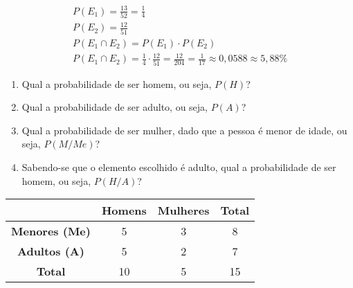 \documentclass{jhwhw}
\begin{document}
\begin{gather*}
	P(E_1) = \frac{13}{52} = \frac{1}{4}\\
	P(E_2) = \frac{12}{51}\\
	P(E_1 \cap E_2) = P(E_1) \cdot P(E_2)\\
	P(E_1 \cap E_2) = \frac{1}{4} \cdot \frac{12}{51} = \frac{12}{204} = \frac{1}{17} \approx 0,0588 \approx \boxed{5,88\%}
\end{gather*}
\begin{enumerate}
	\item Qual a probabilidade de ser homem, ou seja, $P(H)$?
	\item Qual a probabilidade de ser adulto, ou seja, $P(A)$?
	\item Qual a probabilidade de ser mulher, dado que a pessoa é menor de idade, ou seja, $P(M/Me)$?
	\item Sabendo-se que o elemento escolhido é adulto, qual a probabilidade de ser homem, ou seja, $P(H/A)$?
\end{enumerate}
\begin{center}
	\begin{tabular}{|c|c|c|c|}
		\hline
		                      & \textbf{Homens} & \textbf{Mulheres} & \textbf{Total} \\ \hline
		\textbf{Menores (Me)} & 5               & 3                 & 8              \\ \hline
		\textbf{Adultos (A)}  & 5               & 2                 & 7              \\ \hline
		\textbf{Total}        & 10              & 5                 & 15             \\ \hline
	\end{tabular}
\end{center}
\end{document}

